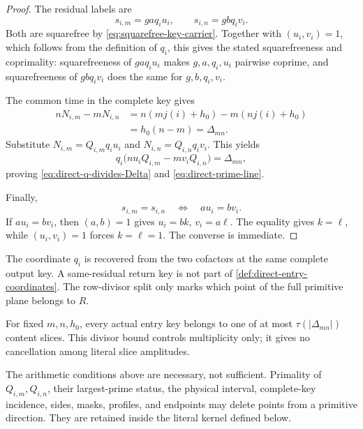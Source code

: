 \begin{proof}
The residual labels are
\[
 s_{i,m}=gaq_i u_i,\qquad
 s_{i,n}=gbq_i v_i.
\]
Both are squarefree by \eqref{eq:squarefree-key-carrier}.  Together with
\((u_i,v_i)=1\), which follows from the definition of \(q_i\), this gives
the stated squarefreeness and coprimality: squarefreeness of
\(gaq_iu_i\) makes \(g,a,q_i,u_i\) pairwise coprime, and squarefreeness
of \(gbq_iv_i\) does the same for \(g,b,q_i,v_i\).

The common time in the complete key gives
\begin{align*}
 nN_{i,m}-mN_{i,n}
 &=
 n(mj(i)+h_0)-m(nj(i)+h_0)\\
 &=h_0(n-m)=\Delta_{mn}.
\end{align*}
Substitute \(N_{i,m}=Q_{i,m}q_i u_i\) and
\(N_{i,n}=Q_{i,n}q_i v_i\).  This yields
\[
 q_i\bigl(nu_iQ_{i,m}-mv_iQ_{i,n}\bigr)=\Delta_{mn},
\]
proving \eqref{eq:direct-q-divides-Delta} and
\eqref{eq:direct-prime-line}.

Finally,
\[
 s_{i,m}=s_{i,n}
 \quad\Longleftrightarrow\quad
 au_i=bv_i.
\]
If \(au_i=bv_i\), then \((a,b)=1\) gives
\(u_i=bk\), \(v_i=a\ell\).  The equality gives \(k=\ell\), while
\((u_i,v_i)=1\) forces \(k=\ell=1\).  The converse is immediate.
\end{proof}

\begin{remark}
\label{rem:no-anchor-needed}
The coordinate \(q_i\) is recovered from the two cofactors at the same
complete output key.  A same-residual return key is not part of
\cref{def:direct-entry-coordinates}.  The row-divisor split only marks
which point of the full primitive plane belongs to \(R\).
\end{remark}

\begin{corollary}
\label{cor:divisor-many-direct-slices}
For fixed \(m,n,h_0\), every actual entry key belongs to one of at most
\(\tau(|\Delta_{mn}|)\) content slices.  This divisor bound controls
multiplicity only; it gives no cancellation among literal slice
amplitudes.
\end{corollary}

\begin{remark}
The arithmetic conditions above are necessary, not sufficient.  Primality
of \(Q_{i,m},Q_{i,n}\), their largest-prime status, the physical interval,
complete-key incidence, sides, masks, profiles, and endpoints may delete
points from a primitive direction.  They are retained inside the literal
kernel defined below.
\end{remark}
